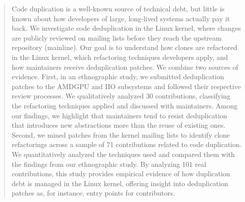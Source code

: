 \documentclass[10pt,conference]{IEEEtran}
\begin{document}
\begin{abstract}
Code duplication is a well-known source of technical debt, but little is known about how developers of large, long-lived systems actually pay it back. We investigate code deduplication in the Linux kernel, where changes are publicly reviewed on mailing lists before they reach the upstream repository (mainline). Our goal is to understand how clones are refactored in the Linux kernel, which refactoring techniques developers apply, and how maintainers receive deduplication patches. We combine two sources of evidence. First, in an ethnographic study, we submitted deduplication patches to the AMDGPU and IIO subsystems and followed their respective review processes. We qualitatively analyzed 30 contributions, classifying the refactoring techniques applied and discussed with maintainers. Among our findings, we highlight that maintainers tend to resist deduplication that introduces new abstractions more than the reuse of existing ones. Second, we mined patches from the kernel mailing lists to identify clone refactorings across a sample of 71 contributions related to code duplication. We quantitatively analyzed the techniques used and compared them with the findings from our ethnographic study. By analyzing 101 real contributions, this study provides empirical evidence of how duplication debt is managed in the Linux kernel, offering insight into deduplication patches as, for instance, entry points for contributors.
\end{abstract}
\end{document}

